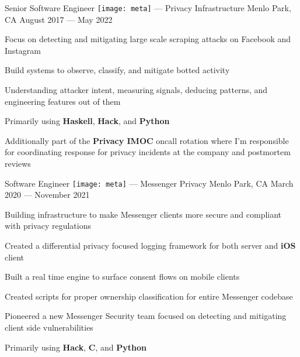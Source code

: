 \begin{cventries}
\vspace{\myspacing}


\cventry
{Senior Software Engineer} %
{{\texttt{[image: meta]}} --- Privacy Infrastructure} %
{Menlo Park, CA} %
{August 2017 --- May 2022} %
{%
  \begin{cvitems}
    \item {Focus on detecting and mitigating large scale scraping attacks on Facebook and Instagram}
    \item {Build systems to observe, classify, and mitigate botted activity}
    \item {Understanding attacker intent, measuring signals, deducing patterns, and engineering features out of them}
    \item {Primarily using \textbf{Haskell}, \textbf{Hack}, and \textbf{Python}}
    \item {Additionally part of the \textbf{Privacy IMOC} oncall rotation where I'm responsible for coordinating response for privacy incidents at the company and postmortem reviews}
  \end{cvitems}
}

\vspace{\myspacing}


\cventry
{Software Engineer} %
{{\texttt{[image: meta]}} --- Messenger Privacy} %
{Menlo Park, CA} %
{March 2020 --- November 2021} %
{%
  \begin{cvitems}
    \item {Building infrastructure to make Messenger clients more secure and compliant with privacy regulations}
    \item {Created a differential privacy focused logging framework for both server and \textbf{iOS} client}
    \item {Built a real time engine to surface consent flows on mobile clients}
    \item {Created scripts for proper ownership classification for entire Messenger codebase}
    \item {Pioneered a new Messenger Security team focused on detecting and mitigating client side vulnerabilities}
    \item {Primarily using \textbf{Hack}, \textbf{C}, and \textbf{Python}}
  \end{cvitems}
}


\end{cventries}
